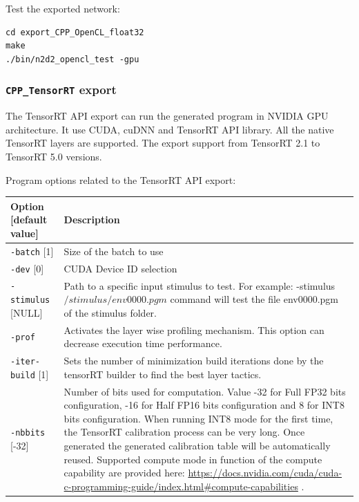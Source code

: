 \documentclass[a4paper,11pt,oneside]{article}
\begin{document}
Test the exported network:
\begin{lstlisting}
cd export_CPP_OpenCL_float32
make
./bin/n2d2_opencl_test -gpu
\end{lstlisting}

\subsubsection{\texorpdfstring{%
\lstinline[basicstyle=\ttfamily\bfseries]!CPP_TensorRT! export}{CPP\_TensorRT export}}
The TensorRT API export can run the generated program in NVIDIA GPU architecture.
It use CUDA, cuDNN and TensorRT API library.
All the native TensorRT layers are supported.
The export support from TensorRT 2.1 to TensorRT 5.0 versions.

Program options related to the TensorRT API export:
\begin{center}
 \begin{tabular}{| p{5cm} | p{10cm} | }
 \hline
 Option [default value] & Description\\
 \hline\hline
  \lstinline!-batch! [1] & Size of the batch to use \\
  \lstinline!-dev! [0] & CUDA Device ID selection  \\
  \lstinline!-stimulus! [NULL] & Path to a specific input stimulus to test.
  For example: -stimulus ${/stimulus/env0000.pgm}$ command will test the file
   env0000.pgm  of the stimulus folder.\\
  \lstinline!-prof! & Activates the layer wise profiling mechanism. This option
  can decrease execution time performance.\\
  \lstinline!-iter-build! [1] & Sets the number of minimization build iterations
  done by the tensorRT builder to find the best layer tactics.\\
  \lstinline!-nbbits! [-32] & Number of bits used for computation. Value -32 for Full FP32 bits configuration, 
  -16 for Half FP16 bits configuration and 8 for INT8 bits configuration. When running INT8 mode for the first time,
  the TensorRT calibration process can be very long. Once generated the generated calibration table will be automatically
  reused. Supported compute mode in function of the compute capability are provided here: 
  \url{https://docs.nvidia.com/cuda/cuda-c-programming-guide/index.html#compute-capabilities} . \\
 \hline
\end{tabular}
\end{center}
\end{document}
